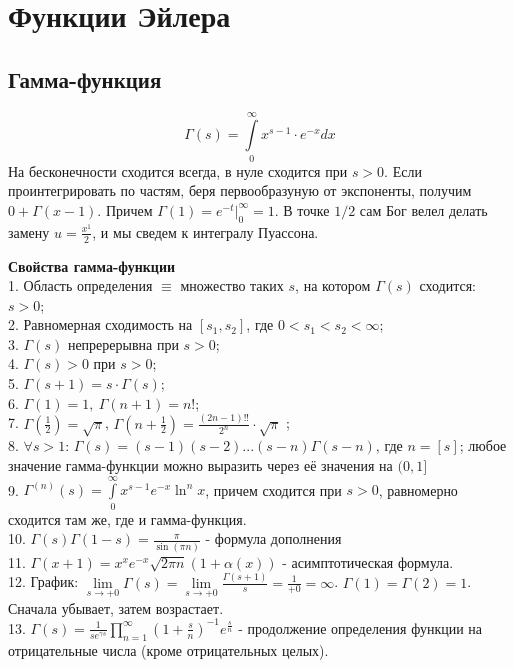 \chapter{Функции Эйлера}
\section{Гамма-функция}
$$\Gamma(s)=\int\limits_{0}^{\infty}x^{s-1}\cdot e^{-x}dx$$
На бесконечности сходится всегда, в нуле сходится при $s>0$.
Если проинтегрировать по частям, беря первообразуную от экспоненты, 
получим  $0+\Gamma(x-1)$. Причем $\Gamma(1)=e^{-t}\Big|_0^\infty=1$.
В точке $1/2$ сам Бог велел делать замену  $u=\frac{x^1}{2}$, и мы 
сведем к интегралу Пуассона. 

\textbf{Свойства гамма-функции}\\
1. Область определения $\equiv$ множество таких $s$, на котором 
$\Gamma(s)$ сходится:  $s>0$;\\
2. Равномерная сходимость на $[s_1,s_2]$, где $0<s_1<s_2<\infty$;\\
3. $\Gamma(s)$ непререрывна при  $s>0$;\\
4.  $\Gamma(s)>0$ при  $s>0$;\\
5.  $\boxed{\Gamma(s+1)=s\cdot \Gamma(s)}$;\\
6. $\Gamma(1)=1,~\Gamma(n+1)=n!$;\\
7.  $\Gamma\left( \frac{1}{2} \right)=\sqrt{\pi}$, $\Gamma\left( 
n+\frac{1}{2}\right)=\frac{(2n-1)!!}{2^n}\cdot \sqrt{\pi}$ ;\\
8. $\forall s>1$: $\Gamma(s)=(s-1)(s-2)...(s-n)\Gamma(s-n)$, где  $n=[s]$; 
любое значение гамма-функции можно выразить через её значения на $(0,1]$\\
9. $\Gamma^{(n)}(s)=\int\limits_{0}^{\infty}x^{s-1}e^{-x}\ln^nx$, 
причем сходится при $s>0$, равномерно сходится там же, где и гамма-функция.\\
10. $\Gamma(s)\Gamma(1-s)=\frac{\pi}{\sin(\pi n)}$ - формула дополнения\\
11. $\Gamma(x+1)=x^xe^{-x}\sqrt{2\pi n}(1+\alpha(x))$ - асимптотическая 
формула.\\
12. График: $\lim\limits_{s \to +0} \Gamma(s)=
\lim\limits_{s \to +0} \frac{\Gamma(s+1)}{s}=\frac{1}{+0}=\infty$.
$\Gamma(1)=\Gamma(2)=1$. Сначала убывает, затем возрастает.\\
13. $\Gamma(s)=\frac{1}{se^{\gamma s}}\prod\limits_{n=1}^{\infty}
\left( 1+\frac{s}{n} \right)^{-1}e^{\frac{s}{n}}$ - продолжение определения
функции на отрицательные числа (кроме отрицательных целых). 

